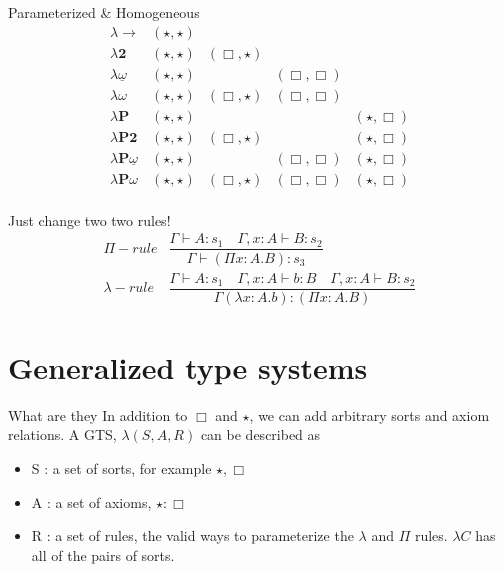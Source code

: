 \documentclass{beamer}
\begin{document}
\begin{frame}{Parameterized \& Homogeneous}
    \[
    \begin{array}{l|cccc}
\lambda\rightarrow & (\star, \star)\\
\lambda \textbf{2} & (\star, \star) & (\Box, \star) \\
\lambda \underline\omega & (\star, \star) && (\Box, \Box) \\
\lambda \omega& (\star, \star) & (\Box, \star) & (\Box, \Box) \\
\lambda\textbf{P} & (\star, \star) &&& (\star, \Box)\\
\lambda \textbf{P2} & (\star, \star) & (\Box, \star)&& (\star, \Box) \\
\lambda \textbf{P}\underline\omega & (\star, \star) && (\Box, \Box)& (\star, \Box) \\
\lambda \textbf{P}\omega& (\star, \star) & (\Box, \star) & (\Box, \Box)&(\star, \Box) \\

\end{array}
    \]
\end{frame}



\begin{frame}{Just change two two rules!}
    \[
    \begin{array}{lc}
\Pi{-}rule & \dfrac{\Gamma \vdash A : s_1\quad \Gamma, x : A \vdash B : s_2}{\Gamma \vdash (\Pi x : A . B) : s_3} \\[1cm]
\lambda{-}rule &\dfrac{\Gamma \vdash A : s_1\quad \Gamma, x : A \vdash b : B\quad \Gamma, x : A \vdash B : s_2}{\Gamma (\lambda x: A .b) : (\Pi x : A . B)}
\end{array}
    \]
\end{frame}

\section{Generalized type systems}

\begin{frame}{What are they}
    In addition to $\Box$ and $\star$, we can add arbitrary sorts and axiom relations. A GTS, $\lambda(S, A, R)$ can be described as 
    \begin{itemize}
        \item<1-> S : a set of sorts, for example $\star, \Box$
        \item<2-> A : a set of axioms, $\star : \Box$
        \item<3-> R : a set of rules, the valid ways to parameterize the $\lambda$ and $\Pi$ rules. $\lambda C$ has all of the pairs of sorts.
    \end{itemize}
\end{frame}
\end{document}
